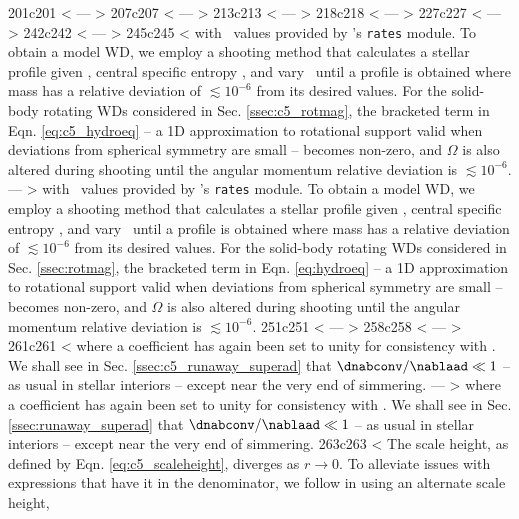 201c201
< \label{eq:c5_eos_rcc}
---
> \label{eq:eos_rcc}
207c207
< \label{ssec:c5_numericalmodels}
---
> \label{ssec:numericalmodels}
213c213
< \label{eq:c5_hydroeq}
---
> \label{eq:hydroeq}
218c218
< \label{eq:c5_radmass}
---
> \label{eq:radmass}
227c227
< \label{eq:c5_temp_profile}
---
> \label{eq:temp_profile}
242c242
< \label{eq:c5_dldm}
---
> \label{eq:dldm}
245c245
< \noindent with \epscc\ values provided by \mesa's \texttt{rates} module.  To obtain a model WD, we employ a shooting method that calculates a stellar profile given \rhoc, central specific entropy \Sc, and vary \rhoc\ until a profile is obtained where mass has a relative deviation of $\lesssim 10^{-6}$ from its desired values.  For the solid-body rotating WDs considered in Sec. \ref{ssec:c5_rotmag}, the bracketed term in Eqn. \ref{eq:c5_hydroeq} -- a 1D approximation to rotational support valid when deviations from spherical symmetry are small -- becomes non-zero, and $\Omega$ is also altered during shooting until the angular momentum relative deviation is $\lesssim 10^{-6}$.
---
> \noindent with \epscc\ values provided by \mesa's \texttt{rates} module.  To obtain a model WD, we employ a shooting method that calculates a stellar profile given \rhoc, central specific entropy \Sc, and vary \rhoc\ until a profile is obtained where mass has a relative deviation of $\lesssim 10^{-6}$ from its desired values.  For the solid-body rotating WDs considered in Sec. \ref{ssec:rotmag}, the bracketed term in Eqn. \ref{eq:hydroeq} -- a 1D approximation to rotational support valid when deviations from spherical symmetry are small -- becomes non-zero, and $\Omega$ is also altered during shooting until the angular momentum relative deviation is $\lesssim 10^{-6}$.
251c251
< \label{eq:c5_tempgrad}
---
> \label{eq:tempgrad}
258c258
< \label{eq:c5_superad_dev}
---
> \label{eq:superad_dev}
261c261
< \noindent where a coefficient has again been set to unity for consistency with \citeal{piroc08}.  We shall see in Sec. \ref{ssec:c5_runaway_superad} that $\dnabconv/\nablaad \ll 1$ -- as usual in stellar interiors -- except near the very end of simmering.
---
> \noindent where a coefficient has again been set to unity for consistency with \citeal{piroc08}.  We shall see in Sec. \ref{ssec:runaway_superad} that $\dnabconv/\nablaad \ll 1$ -- as usual in stellar interiors -- except near the very end of simmering.
263c263
< The scale height, as defined by Eqn. \ref{eq:c5_scaleheight}, diverges as $r\rightarrow0$.  To alleviate issues with expressions that have it in the denominator, we follow \cite{paxt+11} in using an alternate scale height,
